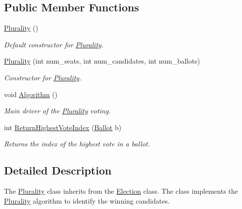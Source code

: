 \subsection*{Public Member Functions}
\begin{DoxyCompactItemize}
\item 
\mbox{\label{class_plurality_a26d4ba756a5bfc0d5c8d40865e5ecbb8}} 
\mbox{\hyperlink{class_plurality_a26d4ba756a5bfc0d5c8d40865e5ecbb8}{Plurality}} ()
\begin{DoxyCompactList}\small\item\em Default constructor for \mbox{\hyperlink{class_plurality}{Plurality}}. \end{DoxyCompactList}\item 
\mbox{\hyperlink{class_plurality_a4fc0116515730145cf4d4cfedbf34b1c}{Plurality}} (int num\+\_\+seats, int num\+\_\+candidates, int num\+\_\+ballots)
\begin{DoxyCompactList}\small\item\em Constructor for \mbox{\hyperlink{class_plurality}{Plurality}}. \end{DoxyCompactList}\item 
\mbox{\label{class_plurality_a63b556aa77c6ea04f52a42fadc9474e8}} 
void \mbox{\hyperlink{class_plurality_a63b556aa77c6ea04f52a42fadc9474e8}{Algorithm}} ()
\begin{DoxyCompactList}\small\item\em Main driver of the \mbox{\hyperlink{class_plurality}{Plurality}} voting. \end{DoxyCompactList}\item 
int \mbox{\hyperlink{class_plurality_a9617e0aacc5e6fb714632f4657ee6576}{Return\+Highest\+Vote\+Index}} (\mbox{\hyperlink{class_ballot}{Ballot}} b)
\begin{DoxyCompactList}\small\item\em Returns the index of the highest vote in a ballot. \end{DoxyCompactList}\end{DoxyCompactItemize}


\subsection{Detailed Description}
The \mbox{\hyperlink{class_plurality}{Plurality}} class inherits from the \mbox{\hyperlink{class_election}{Election}} class. The class implements the \mbox{\hyperlink{class_plurality}{Plurality}} algorithm to identify the winning candidates. 



